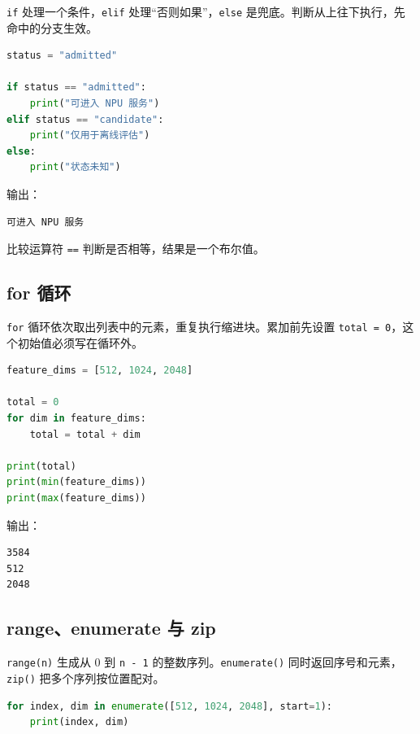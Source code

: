 \passthrough{\lstinline!if!}
处理一个条件，\passthrough{\lstinline!elif!}
处理``否则如果''，\passthrough{\lstinline!else!}
是兜底。判断从上往下执行，先命中的分支生效。

\begin{lstlisting}[language=Python]
status = "admitted"

if status == "admitted":
    print("可进入 NPU 服务")
elif status == "candidate":
    print("仅用于离线评估")
else:
    print("状态未知")
\end{lstlisting}

输出：

\begin{lstlisting}
可进入 NPU 服务
\end{lstlisting}

比较运算符 \passthrough{\lstinline!==!} 判断是否相等，结果是一个布尔值。

\subsection{for 循环}\label{for-ux5faaux73af}

\passthrough{\lstinline!for!}
循环依次取出列表中的元素，重复执行缩进块。累加前先设置
\passthrough{\lstinline!total = 0!}，这个初始值必须写在循环外。

\begin{lstlisting}[language=Python]
feature_dims = [512, 1024, 2048]

total = 0
for dim in feature_dims:
    total = total + dim

print(total)
print(min(feature_dims))
print(max(feature_dims))
\end{lstlisting}

输出：

\begin{lstlisting}
3584
512
2048
\end{lstlisting}

\subsection{range、enumerate 与 zip}\label{rangeenumerate-ux4e0e-zip}

\passthrough{\lstinline!range(n)!} 生成从 0 到
\passthrough{\lstinline!n - 1!}
的整数序列。\passthrough{\lstinline!enumerate()!}
同时返回序号和元素，\passthrough{\lstinline!zip()!}
把多个序列按位置配对。

\begin{lstlisting}[language=Python]
for index, dim in enumerate([512, 1024, 2048], start=1):
    print(index, dim)
\end{lstlisting}

